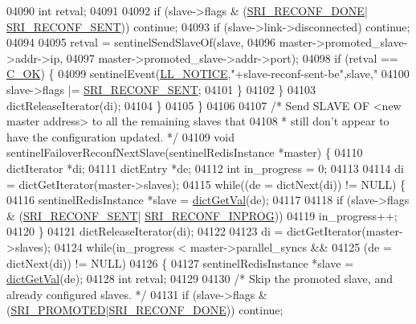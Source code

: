 \begin{DoxyCode}
{{{{{{{{{{{{{{{{{{{{{{{{{{{{{{{{{{{{{{{{{{{{{{{{{{{{{{{{{{{{{{{{{{{{{{{{{{{{{{{{{{{{{{{{{{{{{{{{{{04090             \textcolor{keywordtype}{int} retval;
04091 
04092             \textcolor{keywordflow}{if} (slave->flags & (\hyperlink{sentinel_8c_adb468d0a8c96c954b6af26aa670d7a11}{SRI\_RECONF\_DONE}|
      \hyperlink{sentinel_8c_a9b307b68cb1615ead6aacb0de34910e6}{SRI\_RECONF\_SENT})) \textcolor{keywordflow}{continue};
04093             \textcolor{keywordflow}{if} (slave->link->disconnected) \textcolor{keywordflow}{continue};
04094 
04095             retval = sentinelSendSlaveOf(slave,
04096                     master->promoted\_slave->addr->ip,
04097                     master->promoted\_slave->addr->port);
04098             \textcolor{keywordflow}{if} (retval == \hyperlink{server_8h_a303769ef1065076e68731584e758d3e1}{C\_OK}) \{
04099                 sentinelEvent(\hyperlink{server_8h_a8c54c191e436c7dd3012167212692401}{LL\_NOTICE},\textcolor{stringliteral}{"+slave-reconf-sent-be"},slave,\textcolor{stringliteral}{"%
04100                 slave->flags |= \hyperlink{sentinel_8c_a9b307b68cb1615ead6aacb0de34910e6}{SRI\_RECONF\_SENT};
04101             \}
04102         \}
04103         dictReleaseIterator(di);
04104     \}
04105 \}
04106 
04107 \textcolor{comment}{/* Send SLAVE OF <new master address> to all the remaining slaves that}
04108 \textcolor{comment}{ * still don't appear to have the configuration updated. */}
04109 \textcolor{keywordtype}{void} sentinelFailoverReconfNextSlave(sentinelRedisInstance *master) \{
04110     dictIterator *di;
04111     dictEntry *de;
04112     \textcolor{keywordtype}{int} in\_progress = 0;
04113 
04114     di = dictGetIterator(master->slaves);
04115     \textcolor{keywordflow}{while}((de = dictNext(di)) != NULL) \{
04116         sentinelRedisInstance *slave = \hyperlink{dict_8h_ae8d2cc391873b2bea2b87c4f80f43120}{dictGetVal}(de);
04117 
04118         \textcolor{keywordflow}{if} (slave->flags & (\hyperlink{sentinel_8c_a9b307b68cb1615ead6aacb0de34910e6}{SRI\_RECONF\_SENT}|
      \hyperlink{sentinel_8c_a58c89f4aaa1bdfde4c25e3bb476c35aa}{SRI\_RECONF\_INPROG}))
04119             in\_progress++;
04120     \}
04121     dictReleaseIterator(di);
04122 
04123     di = dictGetIterator(master->slaves);
04124     \textcolor{keywordflow}{while}(in\_progress < master->parallel\_syncs &&
04125           (de = dictNext(di)) != NULL)
04126     \{
04127         sentinelRedisInstance *slave = \hyperlink{dict_8h_ae8d2cc391873b2bea2b87c4f80f43120}{dictGetVal}(de);
04128         \textcolor{keywordtype}{int} retval;
04129 
04130         \textcolor{comment}{/* Skip the promoted slave, and already configured slaves. */}
04131         \textcolor{keywordflow}{if} (slave->flags & (\hyperlink{sentinel_8c_a6c6c019b1af48a9c0e9507422051c684}{SRI\_PROMOTED}|\hyperlink{sentinel_8c_adb468d0a8c96c954b6af26aa670d7a11}{SRI\_RECONF\_DONE})) \textcolor{keywordflow}{continue};
}}}}}}}}}}}}}}}}}}}}}}}}}}}}}}}}}}}}}}}}}}}}}}}}}}}}}}}}}}}}}}}}}}}}}}}}}}}}}}}}}}}}}}}}}}}}}}}}}}}
\end{DoxyCode}
